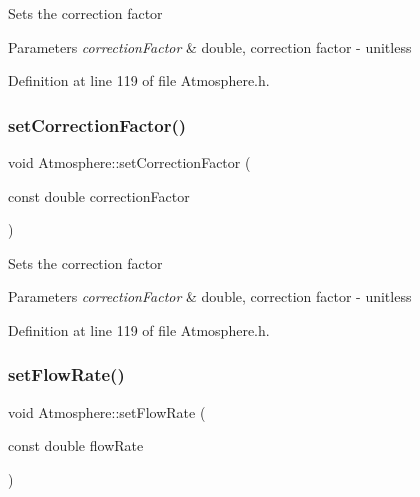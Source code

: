 Sets the correction factor 
\begin{DoxyParams}{Parameters}
{\em correction\+Factor} & double, correction factor -\/ unitless \\
\hline
\end{DoxyParams}


Definition at line 119 of file Atmosphere.\+h.

\mbox{\label{class_atmosphere_a86fab4b05de35c9a2b1a3a7e5ab70779}} 
\subsubsection{\texorpdfstring{set\+Correction\+Factor()}{setCorrectionFactor()}\hspace{0.1cm}{\footnotesize\ttfamily [3/3]}}
{\footnotesize\ttfamily void Atmosphere\+::set\+Correction\+Factor (\begin{DoxyParamCaption}\item[{const double}]{correction\+Factor }\end{DoxyParamCaption})\hspace{0.3cm}{\ttfamily [inline]}}

Sets the correction factor 
\begin{DoxyParams}{Parameters}
{\em correction\+Factor} & double, correction factor -\/ unitless \\
\hline
\end{DoxyParams}


Definition at line 119 of file Atmosphere.\+h.

\mbox{\label{class_atmosphere_a9ff0b718c810aec0bb101336db69fd22}} 
\subsubsection{\texorpdfstring{set\+Flow\+Rate()}{setFlowRate()}\hspace{0.1cm}{\footnotesize\ttfamily [1/3]}}
{\footnotesize\ttfamily void Atmosphere\+::set\+Flow\+Rate (\begin{DoxyParamCaption}\item[{const double}]{flow\+Rate }\end{DoxyParamCaption})\hspace{0.3cm}{\ttfamily [inline]}}

